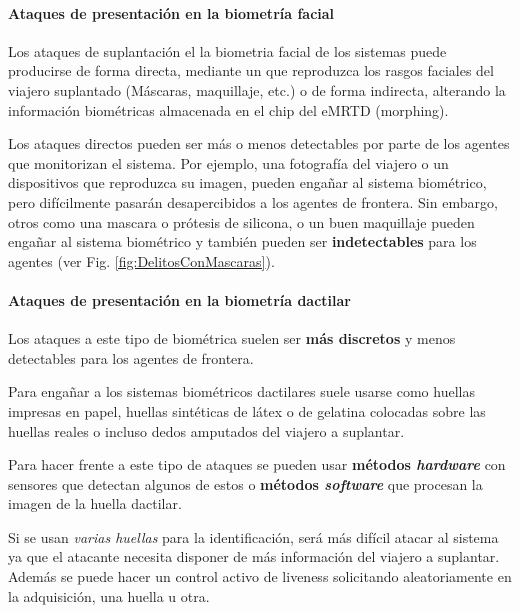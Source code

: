 \paragraph{Ataques de presentación en la biometría facial}
Los ataques de suplantación el la \gls{biometria} \gls{facial} de los sistemas  puede producirse de forma directa, mediante un  que reproduzca los rasgos faciales del viajero suplantado (Máscaras, maquillaje, etc.) o de forma indirecta, alterando la información biométricas almacenada en el chip del \gls{eMRTD} (\Gls{morphing}).

Los ataques directos pueden ser más o menos detectables por parte de los agentes que monitorizan el sistema. Por ejemplo, una fotografía del viajero o un dispositivos que reproduzca su imagen, pueden engañar al sistema biométrico, pero difícilmente pasarán desapercibidos a los agentes de frontera. Sin embargo, otros  como una mascara o prótesis de silicona, o un buen maquillaje  pueden engañar al sistema biométrico y también pueden ser \textbf{indetectables} para los agentes (ver Fig. \ref{fig:DelitosConMascaras}).    


\paragraph{Ataques de presentación en la biometría \gls{dactilar}}
Los ataques a este tipo de biométrica suelen ser \textbf{más discretos} y menos detectables para los agentes de frontera.

Para engañar a los sistemas biométricos dactilares suele usarse como  huellas impresas en papel, huellas sintéticas de látex o de gelatina colocadas sobre las huellas reales o incluso dedos amputados del viajero a suplantar. 

Para hacer frente a este tipo de ataques se pueden usar \textbf{métodos \textit{hardware}} con sensores que detectan algunos de estos  o \textbf{métodos \textit{software}} que procesan la imagen de la huella dactilar.  

Si se usan \textit{varias huellas} para la identificación, será más difícil atacar al sistema ya que el atacante necesita disponer de más información del viajero a suplantar. Además se puede hacer un control activo de \gls{liveness} solicitando aleatoriamente en la adquisición, una huella u otra.

